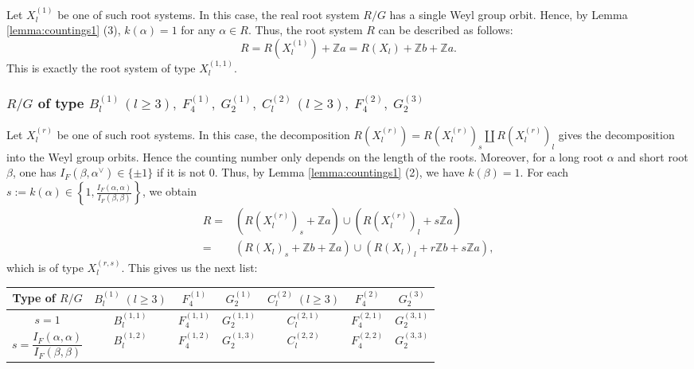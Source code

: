 \documentclass[11pt]{amsart}
\newcommand{\Z}{\mathbb{Z}}
\begin{document}
{\smallskip

Let $X_l^{(1)}$ be one of such root systems. 
In this case, the real root system $R/G$ has a single Weyl group orbit. Hence, by 
Lemma \ref{lemma:countings1} (3), $k(\alpha)=1$ for any $\alpha \in R$. Thus, the 
root system $R$ can be described as follows:
\[ R=R(X_l^{(1)})+\Z a=R(X_l)+\Z b+\Z a.
\]
This is exactly the root system of type $X_l^{(1,1)}$.


\subsubsection{$R/G$ of type $B_l^{(1)}\, (l\geq 3), \; F_4^{(1)}, \; G_2^{(1)}, \; C_l^{(2)}\, 
(l\geq 3), \; F_4^{(2)}, \; G_2^{(3)}$}
Let $X_l^{(r)}$ be one of such root systems. In this case, the decomposition 
$R(X_l^{(r)})=R(X_l^{(r)})_s \amalg R(X_l^{(r)})_l$ gives the decomposition into the Weyl 
group orbits.  Hence the counting number only depends on the length of the roots. 
Moreover, for a long root $\alpha$ and short root $\beta$, one has 
$I_F(\beta, \alpha^\vee) \in \{ \pm 1\}$ if it is not $0$. Thus, by Lemma 
\ref{lemma:countings1} (2), we have $k(\beta)=1$. 
For each $s:=k(\alpha) \in \left\{ 1, \frac{I_F(\alpha, \alpha)}{I_F(\beta, \beta)}\right\}$, we obtain
\begin{align*}
R=
&(R(X_l^{(r)})_s+\Z a) \cup (R(X_l^{(r)})_l+s\Z a)\\
=
&(R(X_l)_s+\Z b +\Z a) \cup (R(X_l)_l+r\Z b+s\Z a),
\end{align*}
which is of type $X_l^{(r,s)}$. This  gives us the next list: \\
\begin{center}
\begin{tabular}{|c||c|c|c|c|c|c|} \hline
Type of $R/G$ & $B_l^{(1)}\; (l\geq 3)$ & $F_4^{(1)}$ & $G_2^{(1)}$ 
                       & $C_l^{(2)}\; (l\geq 3)$ & $F_4^{(2)}$ & $G_2^{(3)}$ \\ \hline
       $s=1$      & $B_l^{(1,1)}$ & $F_4^{(1,1)}$ & $G_2^{(1,1)}$ 
                      & $C_l^{(2,1)}$ & $F_4^{(2,1)}$ & $G_2^{(3,1)}$ \\ \hline
       $s=\dfrac{I_F(\alpha, \alpha)}{I_F(\beta, \beta)}$      
                      & $B_l^{(1,2)}$ & $F_4^{(1,2)}$ & $G_2^{(1,3)}$ 
                      & $C_l^{(2,2)}$ & $F_4^{(2,2)}$ & $G_2^{(3,3)}$ \\ \hline
\end{tabular}
\end{center}

}
\end{document}
